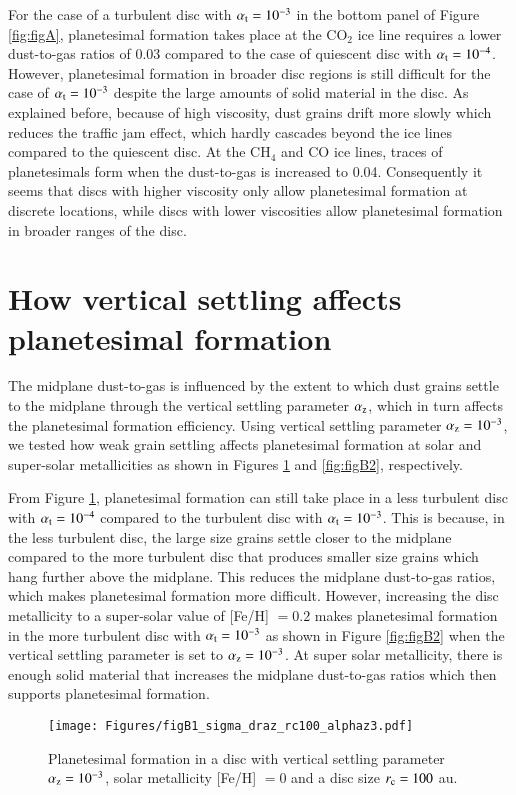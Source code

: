 \documentclass{aa}
\begin{document}
\begin{appendix}
For the case of a turbulent disc with $\alpha_{\rm t}=10^{-3}$ in the bottom panel of Figure \ref{fig:figA}, planetesimal formation takes place at the CO$_2$ ice line requires a lower dust-to-gas ratios of 0.03 compared to the case of quiescent disc with $\alpha_{\rm t}=10^{-4}$. However, planetesimal formation in broader disc regions is still difficult for the case of $\alpha_{\rm t}=10^{-3}$ despite the large amounts of solid material in the disc. As explained before, because of high viscosity, dust grains drift more slowly which reduces the traffic jam effect, which hardly cascades beyond the ice lines compared to the quiescent disc. At the CH$_4$ and CO ice lines, traces of planetesimals form when the dust-to-gas is increased to 0.04. Consequently it seems that discs with higher viscosity only allow planetesimal formation at discrete locations, while discs with lower viscosities allow planetesimal formation in broader ranges of the disc. 

\section{How vertical settling affects planetesimal formation}
\label{AppendixVerticalSettling}
The midplane dust-to-gas is influenced by the extent to which dust grains settle to the midplane through the vertical settling parameter $\alpha_{\rm z}$, which in turn affects the planetesimal formation efficiency.  Using vertical settling parameter $\alpha_{\rm z}=10^{-3}$, we tested how weak grain settling affects planetesimal formation at solar and super-solar metallicities as shown in Figures \ref{fig:figB1} and \ref{fig:figB2}, respectively.

From Figure \ref{fig:figB1}, planetesimal formation can still take place in a less turbulent disc with $\alpha_{\rm t}=10^{-4}$ compared to the turbulent disc with $\alpha_{\rm t}=10^{-3}$. This is because, in the less turbulent disc, the large size grains settle closer to the midplane compared to the more turbulent disc that produces smaller size grains which hang further above the midplane. This reduces the midplane dust-to-gas ratios, which makes planetesimal formation more difficult. However, increasing the disc metallicity to a super-solar value of [Fe/H] $= 0.2$ makes planetesimal formation in the more turbulent disc with $\alpha_{\rm t}=10^{-3}$ as shown in Figure \ref{fig:figB2} when the vertical settling parameter is set to $\alpha_{\rm z}=10^{-3}$. At super solar metallicity, there is enough solid material that increases the midplane dust-to-gas ratios which then supports planetesimal formation.
\begin{figure*}
   \texttt{[image: Figures/figB1\_sigma\_draz\_rc100\_alphaz3.pdf]}
   \caption{Planetesimal formation in a disc with vertical settling parameter $\alpha_{\rm z}=10^{-3}$, solar metallicity [Fe/H] $= 0$ and a disc size $r_{\rm c}=100$ au.}
   \label{fig:figB1}
\end{figure*}


\end{appendix}
\end{document}
